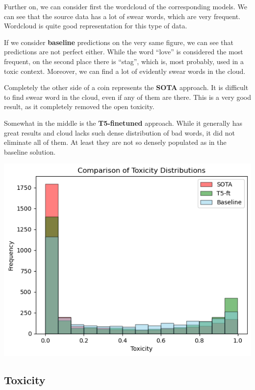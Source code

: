 \begin{multicols*}{2}
Further on, we can consider first the wordcloud of the corresponding models. We
can see that the source data has a lot of swear words, which are very frequent.
Wordcloud is quite good representation for this type of data.

If we consider \textbf{baseline} predictions on the very same figure, we can
see that predictions are not perfect either. While the word ``love'' is
considered the most frequent, on the second place there is ``stag'', which is,
most probably, used in a toxic context. Moreover, we can find a lot of
evidently swear words in the cloud.

Completely the other side of a coin represents the \textbf{SOTA} approach. It
is difficult to find swear word in the cloud, even if any of them are there.
This is a very good result, as it completely removed the open toxicity.

Somewhat in the middle is the \textbf{T5-finetuned} approach. While it
generally has great results and cloud lacks such dense distribution of bad
words, it did not eliminate all of them. At least they are not so densely
populated as in the baseline solution.

\begin{minipage}{\linewidth}
    \includegraphics[scale=0.35]{figures/final/toxicity.png}%
    \label{fig:eval:toxdistr}%
\end{minipage}

\subsection{Toxicity}


\end{multicols*}
